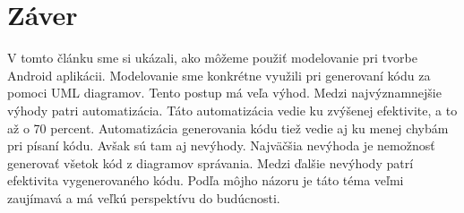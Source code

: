 \documentclass[10pt,twoside,slovak,a4paper]{article}
\begin{document}
 
 

\section{Záver} \label{zaver} %
V tomto článku sme si ukázali, ako môžeme použiť modelovanie pri tvorbe Android aplikácii. Modelovanie sme konkrétne využili pri generovaní kódu za pomoci UML diagramov. Tento postup má veľa výhod. Medzi najvýznamnejšie výhody patri automatizácia. Táto automatizácia vedie ku zvýšenej efektivite, a to až o 70 percent. Automatizácia generovania kódu tiež vedie aj ku menej chybám pri písaní kódu. 
Avšak sú tam aj nevýhody. Najväčšia nevýhoda je nemožnosť generovať všetok kód z diagramov správania. Medzi ďalšie nevýhody patrí efektivita vygenerovaného kódu.\newline
Podľa môjho názoru je táto téma veľmi zaujímavá a má veľkú perspektívu do budúcnosti. 






\end{document}
